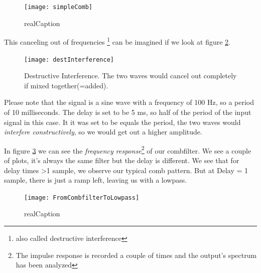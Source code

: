 \begin{figure}[H]
	\centering
	\texttt{[image: simpleComb]}
	\caption[shortCaption]
	{realCaption}
	\label{fig:label}
\end{figure}

This canceling out of frequencies \footnote{also called destructive interference} can be imagined if we look at figure \ref{fig:destIntereference}.
\begin{figure}[H]
	\centering
	\texttt{[image: destInterference]}
	\caption[Destructive Interference]
	{Destructive Interference. The two waves would cancel out completely if mixed together(=added).}
	\label{fig:destIntereference}
\end{figure}

Please note that the signal is a sine wave with a frequency of 100 Hz, so a period of 10 milliseconds. The delay is set to be 5 ms, so half of the period of the input signal in this case. It it was set to be equals the period, the two waves would \textit{interfere constructively}, so we would get out a higher amplitude. \\


In figure \ref{fig:combToLowpass} we can see the \textit{frequency response}\footnote{The impulse response is recorded a couple of times and the output's spectrum has been analyzed} of our combfilter. We see a couple of plots, it's always the same filter but the delay is different. We see that for delay times >1 sample, we observe our typical comb pattern. But at Delay = 1 sample, there is just a ramp left, leaving us with a lowpass.

\begin{figure}[H]
	\centering
	\texttt{[image: FromCombfilterToLowpass]}
	\caption[shortCaption]
	{realCaption}
	\label{fig:combToLowpass}
\end{figure}

